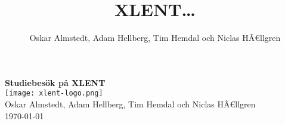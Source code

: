 \documentclass[12pt,a4paper]{report}
\title{XLENT\ldots}
\author{Oskar Almstedt, Adam Hellberg, Tim Hemdal och Niclas HÃ€llgren}
\begin{document}
    \begin{titlepage}
    \begin{center}
    {\Huge\bfseries Studiebesök på XLENT}\\[2cm]
    
    \texttt{[image: xlent-logo.png]}\\[4cm]
    
    Oskar Almstedt, Adam Hellberg, Tim Hemdal och Niclas HÃ€llgren\\[2cm]
    
    \today
    \end{center}
    \end{titlepage}
    
    
    
    
    
    
    
    
\end{document}
